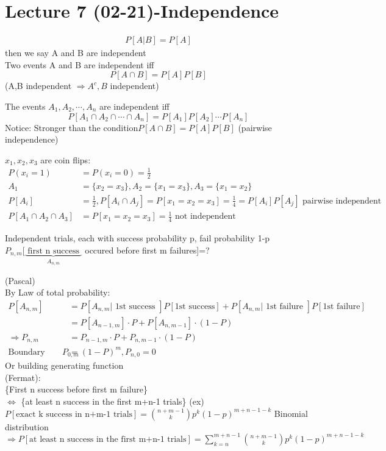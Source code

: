 \section{Lecture 7 (02-21)-{Independence}}
\begin{definition}[Independence]{}
\begin{align*}{}{}
P[A|B]=P[A]
\end{align*} then we say A and B are independent
\\Two events A and B are independent iff $$
    P[A\cap B]=P[A]P[B]
$$ 
(A,B independent $\Rightarrow A^c,B$ independent)
\end{definition}
\begin{definition}{}
The events $A_1,A_2,\cdots,A_n$ are independent iff $$
    P[A_{1}\cap A_{2}\cap\cdots\cap A_{n}]=P[A_1]P[A_{2}]\cdots P[A_{n}]$$
Notice: Stronger than the condition$
    P[A\cap B]=P[A]P[B]
$ (pairwise independence)
\end{definition}
\begin{example}{}
 $ x_1,x_2,x_3 $ are coin flips:
 \begin{align*}{}{}
 P(x_i=1)&=P(x_i=0)=\frac{1}{2}\\
 A_1&=\{x_2=x_3\},A_2=\{x_1=x_3\},A_3=\{x_1=x_2\}\\
 P[A_i]&=\frac{1}{2},P[A_i\cap A_j]=P[x_1=x_2=x_3]=\frac{1}{4}=P[A_i]P[A_j]\text{ pairwise independent}\\
    P[A_1\cap A_2\cap A_3]&=P[x_1=x_2=x_3]=\frac{1}{4} \text{ not independent}
 \end{align*}
\end{example}
\begin{example}[Independence]{}
 Independent trials, each with success probability p, fail probability 1-p\\
 $P_{n,m}[\underbrace{\text{ first n success }}_{A_{n,m}}$ occured before first m failures]=?
 \begin{solution}
    (Pascal)\\
By Law of total probability: \begin{align*}
    P[A_{n,m}]&=P[A_{n,m}|\text{ 1st success }]P[1\text{st success}]+P[A_{n,m}|\text{ 1st failure }]P[1\text{st failure}]  \\
&=P[A_{n-1,m}]\cdot P+P[A_{n,m-1}]\cdot (1-P)\\
\Rightarrow P_{n,m}&=P_{n-1,m}\cdot P+P_{n,m-1}\cdot (1-P)\\
\text{Boundary condition:}P_{0,m}&=(1-P)^m,P_{n,0}=0
\end{align*}
Or building generating function
\\(Fermat):
\\\{First n success before first m failure\} 
\\$ \Leftrightarrow $ \{at least n success in the first m+n-1 trials\} (ex)
\\$ P[\text{exact k success in n+m-1 trials}]=\binom{n+m-1}{k}p^k(1-p)^{m+n-1-k} $ Binomial distribution
\\$ \Rightarrow P[\text{at least n success in the first m+n-1 trials}]=\sum_{k=n}^{m+n-1}\binom{n+m-1}{k}p^k(1-p)^{m+n-1-k}  $  
 \end{solution}
\end{example}
